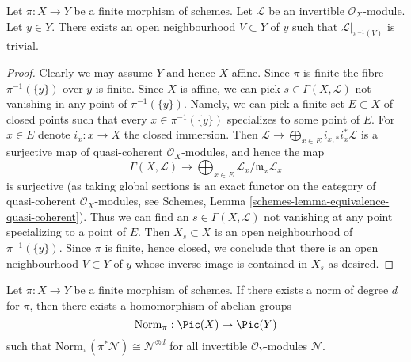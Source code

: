 \begin{lemma}
\label{lemma-finite-trivialize-invertible-upstairs}
Let $\pi : X \to Y$ be a finite morphism of schemes.
Let $\mathcal{L}$ be an invertible $\mathcal{O}_X$-module.
Let $y \in Y$. There exists an open neighbourhood
$V \subset Y$ of $y$ such that $\mathcal{L}|_{\pi^{-1}(V)}$ is trivial.
\end{lemma}

\begin{proof}
Clearly we may assume $Y$ and hence $X$ affine. Since $\pi$ is finite the
fibre $\pi^{-1}(\{y\})$ over $y$ is finite.
Since $X$ is affine, we can pick $s \in \Gamma(X, \mathcal{L})$
not vanishing in any point of $\pi^{-1}(\{y\})$. Namely, we can
pick a finite set $E \subset X$ of closed points such that
every $x \in \pi^{-1}(\{y\})$ specializes to some point of $E$.
For $x \in E$ denote $i_x : x \to X$ the closed immersion.
Then
$\mathcal{L} \to \bigoplus_{x \in E} i_{x, *}i_x^*\mathcal{L}$
is a surjective map of quasi-coherent $\mathcal{O}_X$-modules,
and hence the map
$$
\Gamma(X, \mathcal{L}) \to
\bigoplus\nolimits_{x \in E} \mathcal{L}_x/\mathfrak m_x\mathcal{L}_x
$$
is surjective (as taking global sections is an exact functor on the
category of quasi-coherent $\mathcal{O}_X$-modules, see
Schemes, Lemma \ref{schemes-lemma-equivalence-quasi-coherent}).
Thus we can find an $s \in \Gamma(X, \mathcal{L})$
not vanishing at any point specializing to a point of $E$.
Then $X_s \subset X$ is an open neighbourhood of $\pi^{-1}(\{y\})$.
Since $\pi$ is finite, hence closed, we conclude that there is an
open neighbourhood $V \subset Y$ of $y$ whose inverse image
is contained in $X_s$ as desired.
\end{proof}

\begin{lemma}
\label{lemma-norm-invertible}
Let $\pi : X \to Y$ be a finite morphism of schemes. If there exists
a norm of degree $d$ for $\pi$, then there exists a homomorphism of
abelian groups
$$
\text{Norm}_\pi : \Pic(X) \to \Pic(Y)
$$
such that $\text{Norm}_\pi(\pi^*\mathcal{N}) \cong \mathcal{N}^{\otimes d}$
for all invertible $\mathcal{O}_Y$-modules $\mathcal{N}$.
\end{lemma}

